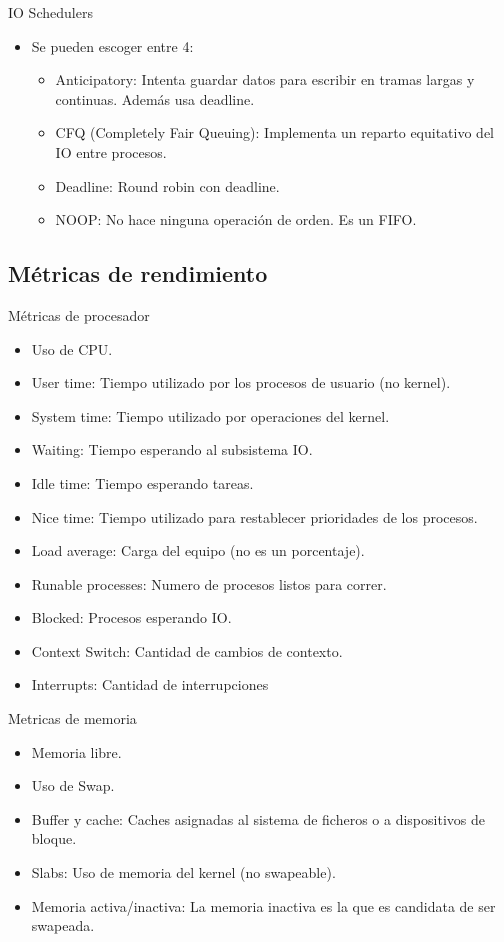 \begin{frame}{IO Schedulers}
	\begin{itemize}
		\item Se pueden escoger entre 4:
		\begin{itemize}
			\item Anticipatory: Intenta guardar datos para escribir en tramas largas y continuas. Además usa deadline.
			\item CFQ (Completely Fair Queuing): Implementa un reparto equitativo del IO entre procesos.
			\item Deadline: Round robin con deadline.
			\item NOOP: No hace ninguna operación de orden. Es un FIFO.
		\end{itemize}
	\end{itemize}
\end{frame}

\subsection{Métricas de rendimiento}
\begin{frame}{Métricas de procesador}
	\begin{itemize}
		\item Uso de CPU.
		\item User time: Tiempo utilizado por los procesos de usuario (no kernel).
		\item System time: Tiempo utilizado por operaciones del kernel.
		\item Waiting: Tiempo esperando al subsistema IO.
		\item Idle time: Tiempo esperando tareas.
		\item Nice time: Tiempo utilizado para restablecer prioridades de los procesos.
		\item Load average: Carga del equipo (no es un porcentaje).
		\item Runable processes: Numero de procesos listos para correr.
		\item Blocked: Procesos esperando IO.
		\item Context Switch: Cantidad de cambios de contexto.
		\item Interrupts: Cantidad de interrupciones
	\end{itemize}
\end{frame}

\begin{frame}{Metricas de memoria}
	\begin{itemize}
		\item Memoria libre.
		\item Uso de Swap.
		\item Buffer y cache: Caches asignadas al sistema de ficheros o a dispositivos de bloque. 
		\item Slabs: Uso de memoria del kernel (no swapeable).
		\item Memoria activa/inactiva: La memoria inactiva es la que es candidata de ser swapeada.
	\end{itemize}
\end{frame}

